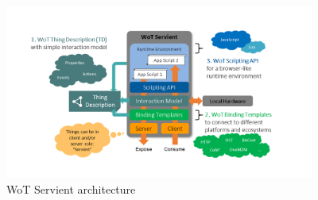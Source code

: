 \begin{figure}[!t]
\centering
\includegraphics[width=4in]{figures/wot-servient.png}
\caption{WoT Servient architecture}
\label{fig-fservient}
\end{figure}


